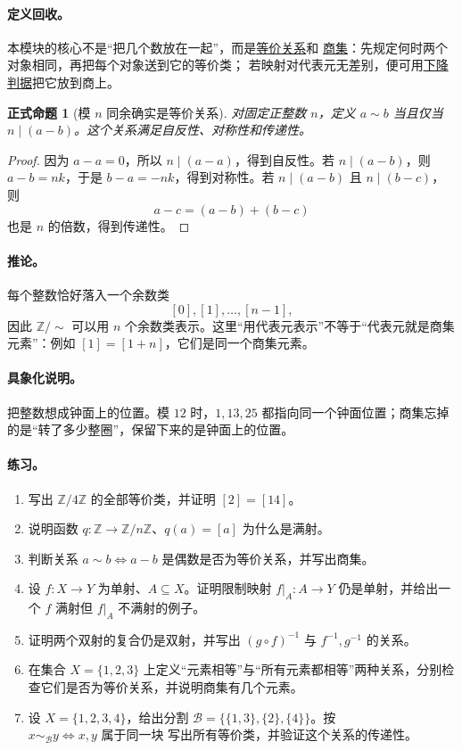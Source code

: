 \documentclass[UTF8,fontset=none,a4paper,11pt]{ctexart}
\theoremstyle{foundation-definition}
\theoremstyle{foundation-theorem}
\theoremstyle{foundation-proposition}
\newtheorem{proposition}[definition]{正式命题}
\theoremstyle{foundation-example}
\theoremstyle{foundation-remark}
\theoremstyle{foundation-theorem}
\newcommand{\term}[2]{\hyperref[#1]{#2}}
\begin{document}
\paragraph{定义回收。}
本模块的核心不是“把几个数放在一起”，而是\term{def:equivalence}{等价关系}和
\term{def:quotient}{商集}：先规定何时两个对象相同，再把每个对象送到它的等价类；
若映射对代表元无差别，便可用\term{prop:quotient-descent}{下降判据}把它放到商上。

\begin{proposition}[模 \(n\) 同余确实是等价关系]\label{prop:mod-equivalence}
对固定正整数 \(n\)，定义 \(a\sim b\) 当且仅当 \(n\mid(a-b)\)。这个关系满足自反性、对称性和传递性。
\end{proposition}

\begin{proof}
因为 \(a-a=0\)，所以 \(n\mid(a-a)\)，得到自反性。若 \(n\mid(a-b)\)，则 \(a-b=nk\)，于是 \(b-a=-nk\)，得到对称性。若 \(n\mid(a-b)\) 且 \(n\mid(b-c)\)，则
\[
a-c=(a-b)+(b-c)
\]
也是 \(n\) 的倍数，得到传递性。
\end{proof}

\paragraph{推论。}
每个整数恰好落入一个余数类
\[
[0],[1],\dots,[n-1],
\]
因此 \(\mathbb Z/{\sim}\) 可以用 \(n\) 个余数类表示。这里“用代表元表示”不等于“代表元就是商集元素”：例如 \([1]=[1+n]\)，它们是同一个商集元素。

\paragraph{具象化说明。}
把整数想成钟面上的位置。模 \(12\) 时，\(1,13,25\) 都指向同一个钟面位置；商集忘掉的是“转了多少整圈”，保留下来的是钟面上的位置。

\paragraph{练习。}
\begin{enumerate}[label=M1.\arabic*.]
  \item 写出 \(\mathbb Z/4\mathbb Z\) 的全部等价类，并证明 \([2]=[14]\)。
  \item 说明函数 \(q:\mathbb Z\to\mathbb Z/n\mathbb Z\)、\(q(a)=[a]\) 为什么是满射。
  \item 判断关系 \(a\sim b\Longleftrightarrow a-b\) 是偶数是否为等价关系，并写出商集。
  \item 设 \(f:X\to Y\) 为单射、\(A\subseteq X\)。证明限制映射
    \(f|_A:A\to Y\) 仍是单射，并给出一个 \(f\) 满射但 \(f|_A\) 不满射的例子。
  \item 证明两个双射的复合仍是双射，并写出 \((g\circ f)^{-1}\) 与
    \(f^{-1},g^{-1}\) 的关系。
  \item 在集合 \(X=\{1,2,3\}\) 上定义“元素相等”与“所有元素都相等”两种关系，分别检查它们是否为等价关系，并说明商集有几个元素。
  \item 设 \(X=\{1,2,3,4\}\)，给出分割
    \(\mathcal B=\{\{1,3\},\{2\},\{4\}\}\)。按
    \(x\sim_{\mathcal B}y\Longleftrightarrow x,y\text{ 属于同一块}\)
    写出所有等价类，并验证这个关系的传递性。
\end{enumerate}
\end{document}
